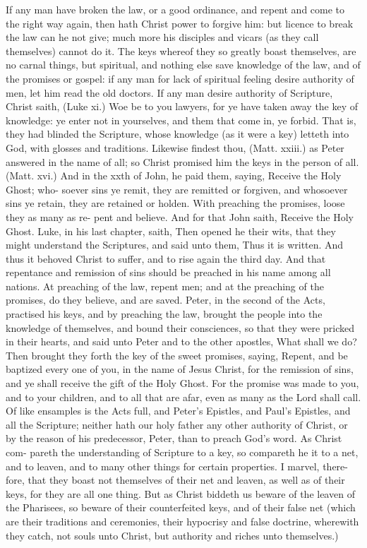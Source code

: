 \documentclass{custom}
\begin{document}
If any man have broken the law, or a good ordinance, 
and repent and come to the right way again, then hath 
Christ power to forgive him: but licence to break the 
law can he not give; much more his disciples and vicars 
(as they call themselves) cannot do it. The keys whereof 
they so greatly boast themselves, are no carnal things, but 
spiritual, and nothing else save knowledge of the law, 
and of the promises or gospel: if any man for lack of 
spiritual feeling desire authority of men, let him read the 
old doctors. If any man desire authority of Scripture, 
Christ saith, (Luke xi.) Woe be to you lawyers, for ye 
have taken away the key of knowledge: ye enter not in 
yourselves, and them that come in, ye forbid. That is, 
they had blinded the Scripture, whose knowledge (as it 
were a key) letteth into God, with glosses and traditions. 
Likewise findest thou, (Matt. xxiii.) as Peter answered 
in the name of all; so Christ promised him the keys in 
the person of all. (Matt. xvi.) And in the xxth of John, 
he paid them, saying, Receive the Holy Ghost; who- 
soever sins ye remit, they are remitted or forgiven, and 
whosoever sins ye retain, they are retained or holden. 
With preaching the promises, loose they as many as re- 
pent and believe. And for that John saith, Receive the 
Holy Ghost. Luke, in his last chapter, saith, Then 
opened he their wits, that they might understand the 
Scriptures, and said unto them, Thus it is written. And 
thus it behoved Christ to suffer, and to rise again the 
third day. And that repentance and remission of sins 
should be preached in his name among all nations. At 
preaching of the law, repent men; and at the preaching 
of the promises, do they believe, and are saved. Peter, 
in the second of the Acts, practised his keys, and by 
preaching the law, brought the people into the knowledge 
of themselves, and bound their consciences, so that they 
were pricked in their hearts, and said unto Peter and to 
the other apostles, What shall we do? Then brought 
they forth the key of the sweet promises, saying, Repent,
and be baptized every one of you, in the name of Jesus 
Christ, for the remission of sins, and ye shall receive the 
gift of the Holy Ghost. For the promise was made to 
you, and to your children, and to all that are afar, even 
as many as the Lord shall call. Of like ensamples is the 
Acts full, and Peter's Epistles, and Paul's Epistles, and 
all the Scripture; neither hath our holy father any other 
authority of Christ, or by the reason of his predecessor, 
Peter, than to preach God's word. As Christ com- 
pareth the understanding of Scripture to a key, so 
compareth he it to a net, and to leaven, and to 
many other things for certain properties. I marvel, there- 
fore, that they boast not themselves of their net and 
leaven, as well as of their keys, for they are all one thing. 
But as Christ biddeth us beware of the leaven of the 
Pharisees, so beware of their counterfeited keys, and of 
their false net (which are their traditions and ceremonies, 
their hypocrisy and false doctrine, wherewith they catch, not 
souls unto Christ, but authority and riches unto themselves.) 
\end{document}
